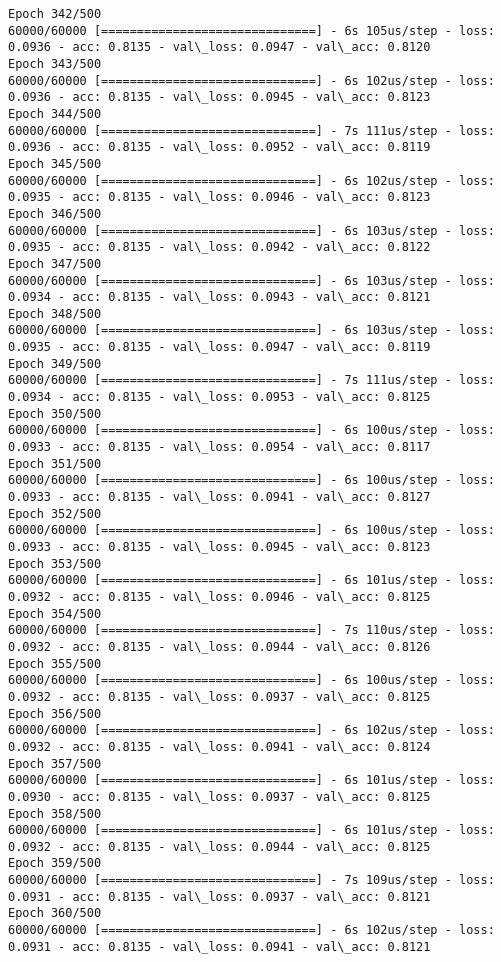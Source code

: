 \documentclass[11pt]{article}
\begin{document}
\begin{Verbatim}[commandchars=\\\{\}]
Epoch 342/500
60000/60000 [==============================] - 6s 105us/step - loss: 0.0936 - acc: 0.8135 - val\_loss: 0.0947 - val\_acc: 0.8120
Epoch 343/500
60000/60000 [==============================] - 6s 102us/step - loss: 0.0936 - acc: 0.8135 - val\_loss: 0.0945 - val\_acc: 0.8123
Epoch 344/500
60000/60000 [==============================] - 7s 111us/step - loss: 0.0936 - acc: 0.8135 - val\_loss: 0.0952 - val\_acc: 0.8119
Epoch 345/500
60000/60000 [==============================] - 6s 102us/step - loss: 0.0935 - acc: 0.8135 - val\_loss: 0.0946 - val\_acc: 0.8123
Epoch 346/500
60000/60000 [==============================] - 6s 103us/step - loss: 0.0935 - acc: 0.8135 - val\_loss: 0.0942 - val\_acc: 0.8122
Epoch 347/500
60000/60000 [==============================] - 6s 103us/step - loss: 0.0934 - acc: 0.8135 - val\_loss: 0.0943 - val\_acc: 0.8121
Epoch 348/500
60000/60000 [==============================] - 6s 103us/step - loss: 0.0935 - acc: 0.8135 - val\_loss: 0.0947 - val\_acc: 0.8119
Epoch 349/500
60000/60000 [==============================] - 7s 111us/step - loss: 0.0934 - acc: 0.8135 - val\_loss: 0.0953 - val\_acc: 0.8125
Epoch 350/500
60000/60000 [==============================] - 6s 100us/step - loss: 0.0933 - acc: 0.8135 - val\_loss: 0.0954 - val\_acc: 0.8117
Epoch 351/500
60000/60000 [==============================] - 6s 100us/step - loss: 0.0933 - acc: 0.8135 - val\_loss: 0.0941 - val\_acc: 0.8127
Epoch 352/500
60000/60000 [==============================] - 6s 100us/step - loss: 0.0933 - acc: 0.8135 - val\_loss: 0.0945 - val\_acc: 0.8123
Epoch 353/500
60000/60000 [==============================] - 6s 101us/step - loss: 0.0932 - acc: 0.8135 - val\_loss: 0.0946 - val\_acc: 0.8125
Epoch 354/500
60000/60000 [==============================] - 7s 110us/step - loss: 0.0932 - acc: 0.8135 - val\_loss: 0.0944 - val\_acc: 0.8126
Epoch 355/500
60000/60000 [==============================] - 6s 100us/step - loss: 0.0932 - acc: 0.8135 - val\_loss: 0.0937 - val\_acc: 0.8125
Epoch 356/500
60000/60000 [==============================] - 6s 102us/step - loss: 0.0932 - acc: 0.8135 - val\_loss: 0.0941 - val\_acc: 0.8124
Epoch 357/500
60000/60000 [==============================] - 6s 101us/step - loss: 0.0930 - acc: 0.8135 - val\_loss: 0.0937 - val\_acc: 0.8125
Epoch 358/500
60000/60000 [==============================] - 6s 101us/step - loss: 0.0932 - acc: 0.8135 - val\_loss: 0.0944 - val\_acc: 0.8125
Epoch 359/500
60000/60000 [==============================] - 7s 109us/step - loss: 0.0931 - acc: 0.8135 - val\_loss: 0.0937 - val\_acc: 0.8121
Epoch 360/500
60000/60000 [==============================] - 6s 102us/step - loss: 0.0931 - acc: 0.8135 - val\_loss: 0.0941 - val\_acc: 0.8121

\end{Verbatim}
\end{document}
